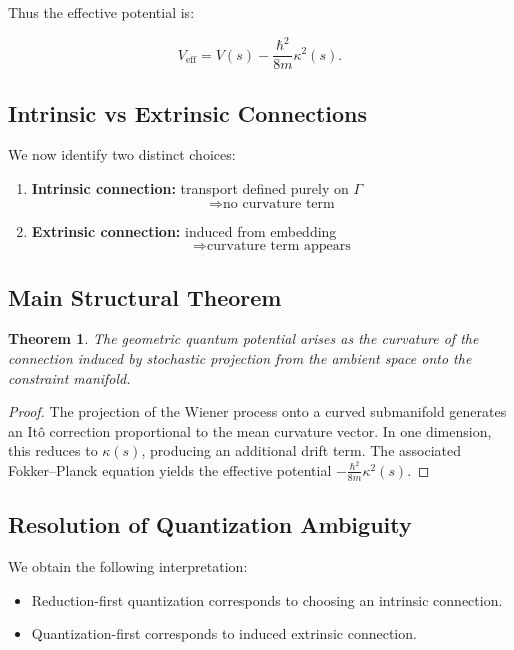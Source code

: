 \documentclass[11pt]{article}
\newtheorem{theorem}{Theorem}[section]
\begin{document}
Thus the effective potential is:

\[
V_{\mathrm{eff}} =
V(s) - \frac{\hbar^2}{8m}\kappa^2(s).
\]

\subsection{Intrinsic vs Extrinsic Connections}

We now identify two distinct choices:

\begin{enumerate}
\item \textbf{Intrinsic connection:} transport defined purely on $\Gamma$  
\[
\Rightarrow \text{no curvature term}
\]

\item \textbf{Extrinsic connection:} induced from embedding  
\[
\Rightarrow \text{curvature term appears}
\]
\end{enumerate}

\subsection{Main Structural Theorem}

\begin{theorem}
The geometric quantum potential arises as the curvature of the connection induced by stochastic projection from the ambient space onto the constraint manifold.
\end{theorem}

\begin{proof}
The projection of the Wiener process onto a curved submanifold generates an It\^o correction proportional to the mean curvature vector. In one dimension, this reduces to $\kappa(s)$, producing an additional drift term. The associated Fokker--Planck equation yields the effective potential $-\frac{\hbar^2}{8m}\kappa^2(s)$.
\end{proof}

\subsection{Resolution of Quantization Ambiguity}

We obtain the following interpretation:

\begin{itemize}
\item Reduction-first quantization corresponds to choosing an intrinsic connection.
\item Quantization-first corresponds to induced extrinsic connection.
\end{itemize}
\end{document}
